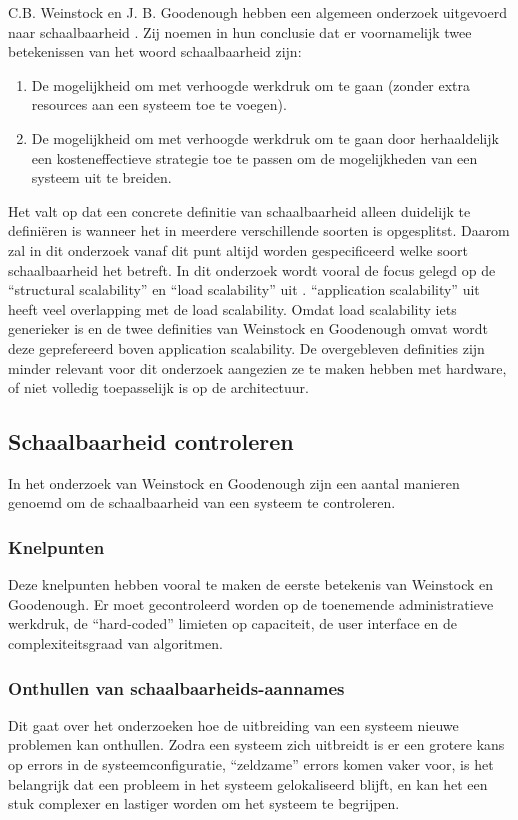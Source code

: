 C.B. Weinstock en J. B. Goodenough hebben een algemeen onderzoek uitgevoerd naar schaalbaarheid \parencite{OnSystemScalability}. Zij noemen in hun conclusie dat er voornamelijk twee betekenissen van het woord schaalbaarheid zijn:
\begin{enumerate}
	\item De mogelijkheid om met verhoogde werkdruk om te gaan (zonder extra resources aan een systeem toe te voegen).
	\item De mogelijkheid om met verhoogde werkdruk om te gaan door herhaaldelijk een kosteneffectieve strategie toe te passen om de mogelijkheden van een systeem uit te breiden.
\end{enumerate}
Het valt op dat een concrete definitie van schaalbaarheid alleen duidelijk te definiëren is wanneer het in meerdere verschillende soorten is opgesplitst. Daarom zal in dit onderzoek vanaf dit punt altijd worden gespecificeerd welke soort schaalbaarheid het betreft. In dit onderzoek wordt vooral de focus gelegd op de \enquote{structural scalability} en \enquote{load scalability} uit \parencite{ScalabilityCharacteristics}. \enquote{application scalability} uit \parencite{AdvancedArchitecture} heeft veel overlapping met de load scalability. Omdat load scalability iets generieker is en de twee definities van Weinstock en Goodenough \parencite{OnSystemScalability} omvat wordt deze geprefereerd boven application scalability. De overgebleven definities zijn minder relevant voor dit onderzoek aangezien ze te maken hebben met hardware, of niet volledig toepasselijk is op de architectuur.

\subsection{Schaalbaarheid controleren}
In het onderzoek van Weinstock en Goodenough \parencite{OnSystemScalability} zijn een aantal manieren genoemd om de schaalbaarheid van een systeem te controleren.

\subsubsection{Knelpunten}
Deze knelpunten hebben vooral te maken de eerste betekenis van Weinstock en Goodenough. Er moet gecontroleerd worden op de toenemende administratieve werkdruk, de \enquote{hard-coded} limieten op capaciteit, de user interface en de complexiteitsgraad van algoritmen.

\subsubsection{Onthullen van schaalbaarheids-aannames}
Dit gaat over het onderzoeken hoe de uitbreiding van een systeem nieuwe problemen kan onthullen. Zodra een systeem zich uitbreidt is er een grotere kans op errors in de systeemconfiguratie, \enquote{zeldzame} errors komen vaker voor, is het belangrijk dat een probleem in het systeem gelokaliseerd blijft, en kan het een stuk complexer en lastiger worden om het systeem te begrijpen.

